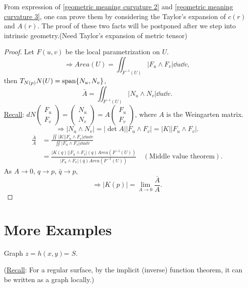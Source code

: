 \begin{remark}
    From expression of \cref{geometric meaning curvature 2} 
    and \cref{geometric meaning curvature 3}, one can prove 
    them by considering the Taylor's expansion of \(c(r)\)
    and \(A(r)\). The proof of these two facts will be postponed
     after we step into intrinsic geometry.(Need Taylor's expansion
      of metric tensor)
\end{remark}
\begin{proof}
    Let \(F(u,v)\) be the local parametrization on \(U\).
    \[
        \Rightarrow Area(U)=\iint_{F^{-1}(U)}\left|
            F_u\wedge F_v
        \right| \dd u\dd v,
    \]
    then \(T_{N(p)}N(U)=\operatorname{span}\{N_u,N_v\}\),
    \[
        \bar{A}=\iint_{F^{-1}(U)} \left|N_u\wedge N_v\right|\dd u
        \dd v.
    \]
    \underline{Recall}: \(dN\begin{pmatrix}
        F_u\\
        F_v
    \end{pmatrix}=\begin{pmatrix}
        N_u\\N_v
    \end{pmatrix}=A\begin{pmatrix}
        F_u\\
        F_v
    \end{pmatrix}\), where \(A\) is the Weingarten matrix.
    \[
        \Rightarrow \left|
            N_u \wedge N_v
        \right|=\left|\det A\right|\left|
            F_u\wedge F_v
        \right|=|K|\left|
            F_u\wedge F_v
        \right|.
    \]
    \begin{align*}
        \frac{\bar{A}}{A}&=\frac{\iint |K|\left|
            F_u\wedge F_v
        \right|\dd u \dd v}{\iint \left|
            F_u\wedge F_v
        \right|\dd u\dd v}\\
        &=\frac{|K(q)|\left|
            F_u\wedge F_v
        \right|(q)Area(F^{-1}(U))}{\left|
            F_u\wedge F_v
        \right|(\bar{q})Area(F^{-1}(U))}\quad (\text{Middle value theorem}).
    \end{align*}
    As \(A\to 0\), \(q\to p\), \(\bar{q}\to p\),
    \[\Rightarrow |K(p)|=\lim_{A\to 0}\frac{\bar{A}}{A}.\]
\end{proof}
\section{More Examples}
\begin{exercise}
    Graph \(z=h(x,y)\)= \(S\). 
\end{exercise}
(\underline{Recall}: For a regular surface, by the implicit (inverse) 
function theorem, it can be written as a graph locally.)

